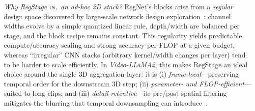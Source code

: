 \begin{enrichment}
\begin{enrichment}
        \emph{Why RegStage vs.\ an ad\mbox{-}hoc 2D stack?} RegNet’s blocks arise from a \emph{regular} design space discovered by large\mbox{-}scale network design exploration~\cite{radosavovic2020_dnds}: channel widths evolve by a simple quantized linear rule, depth/width are balanced per stage, and the block recipe remains constant. This regularity yields predictable compute/accuracy scaling and strong accuracy\mbox{-}per\mbox{-}FLOP at a given budget, whereas “irregular” CNN stacks (arbitrary kernel/width changes per layer) tend to be harder to scale efficiently. In \emph{Video\mbox{-}LLaMA2}, this makes RegStage an ideal choice around the single 3D aggregation layer: it is (i) \emph{frame\mbox{-}local}—preserving temporal order for the downstream 3D step; (ii) \emph{parameter\mbox{-} and FLOP\mbox{-}efficient}—suited to long clips; and (iii) \emph{detail\mbox{-}retentive}—its pre/post spatial filtering mitigates the blurring that temporal downsampling can introduce~\cite[Sec.\,2.1]{cheng2024_videollama2}.
        

\end{enrichment}
\end{enrichment}
